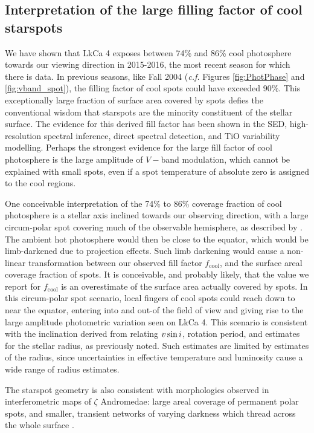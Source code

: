 \documentclass[twocolumn]{emulateapj}%
\begin{document}
\subsection{Interpretation of the large filling factor of cool starspots}
We have shown that LkCa 4 exposes between 74\% and 86\% cool photosphere towards our viewing direction in 2015-2016, the most recent season for which there is data.  In previous seasons, like Fall 2004 (\emph{c.f.} Figures \ref{fig:PhotPhase} and \ref{fig:vband_spot}), the filling factor of cool spots could have exceeded 90\%.  This exceptionally large fraction of surface area covered by spots defies the conventional wisdom that starspots are the minority constituent of the stellar surface.  The evidence for this derived fill factor has been shown in the SED, high-resolution spectral inference, direct spectral detection, and TiO variability modelling.  Perhaps the strongest evidence for the large fill factor of cool photosphere is the large amplitude of $V-$band modulation, which cannot be explained with small spots, even if a spot temperature of absolute zero is assigned to the cool regions.

One conceivable interpretation of the 74\% to 86\% coverage fraction of cool photosphere is a stellar axis inclined towards our observing direction, with a large circum-polar spot covering much of the observable hemisphere, as described by \citet{donati14}.  The ambient hot photosphere would then be close to the equator, which would be limb-darkened due to projection effects.  Such limb darkening would cause a non-linear transformation between our observed fill factor $f_{\mathrm{cool}}$, and the surface areal coverage fraction of spots.  It is conceivable, and probably likely, that the value we report for $f_{\mathrm{cool}}$ is an overestimate of the surface area actually covered by spots.  In this circum-polar spot scenario, local fingers of cool spots could reach down to near the equator, entering into and out-of the field of view and giving rise to the large amplitude photometric variation seen on LkCa 4.  This scenario is consistent with the inclination derived from relating $v \sin i$, rotation period, and estimates for the stellar radius, as previously noted.  Such estimates are limited by estimates of the radius, since uncertainties in effective temperature and luminosity cause a wide range of radius estimates.

The starspot geometry is also consistent with morphologies observed in interferometric maps of $\zeta$ Andromedae: large areal coverage of permanent polar spots, and smaller, transient networks of varying darkness which thread across the whole surface \citep{roettenbacher16}.
\end{document}
